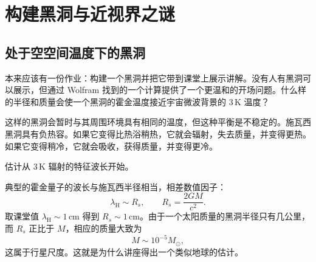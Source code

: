 \chapter{构建黑洞与近视界之谜}


\section{处于空空间温度下的黑洞}

本来应该有一份作业：构建一个黑洞并把它带到课堂上展示讲解。没有人有黑洞可以展示，但通过 Wolfram 找到的一个计算提供了一个更温和的开场问题。什么样的半径和质量会使一个黑洞的霍金温度接近宇宙微波背景的 \(3\,\mathrm{K}\) 温度？

\begin{classroomqa}
\end{classroomqa}

这样的黑洞会暂时与其周围环境具有相同的温度，但这种平衡是不稳定的。施瓦西黑洞具有负热容。如果它变得比热浴稍热，它就会辐射，失去质量，并变得更热。如果它变得稍冷，它就会吸收，获得质量，并变得更冷。

估计从 \(3\,\mathrm{K}\) 辐射的特征波长开始。

\begin{classroomqa}
\end{classroomqa}

典型的霍金量子的波长与施瓦西半径相当，相差数值因子：
\begin{equation}
\lambda_{\mathrm{H}}\sim R_s,
\qquad
R_s=\frac{2GM}{c^2}.
\label{eq:l05-scale}
\end{equation}
取课堂值 \(\lambda_{\mathrm H}\sim1\,\mathrm{cm}\) 得到 \(R_s\sim1\,\mathrm{cm}\)。由于一个太阳质量的黑洞半径只有几公里，而 \(R_s\) 正比于 \(M\)，相应的质量大致为
\begin{equation}
M\sim10^{-5}M_\odot,
\label{eq:l05-rough-mass}
\end{equation}
这属于行星尺度。这就是为什么讲座得出一个类似地球的估计。

